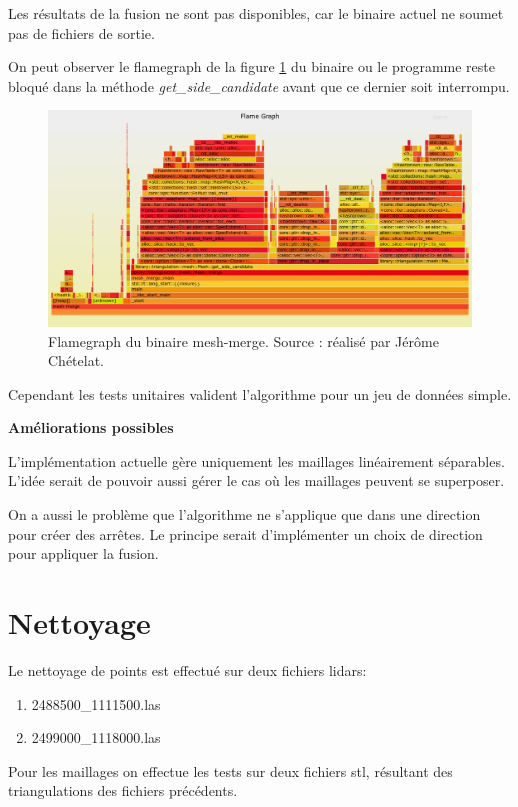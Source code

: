 Les résultats de la fusion ne sont pas disponibles, car le binaire actuel ne
soumet pas de fichiers de sortie.

On peut observer le flamegraph de la figure \ref{fig:flamegraph_mesh_merge}
du binaire ou le programme reste bloqué dans la méthode \textit{get\_side\_candidate}
avant que ce dernier soit interrompu.

\begin{figure}[htbp!]
    \centering
    \includegraphics[width=0.8\linewidth]{figures/merge-debug-flamegraph.png}
    \caption{Flamegraph du binaire mesh-merge. Source : réalisé par Jérôme Chételat.}
    \label{fig:flamegraph_mesh_merge}
\end{figure}


Cependant les tests unitaires valident l'algorithme pour un jeu de données simple.

\textbf{Améliorations possibles}

L'implémentation actuelle gère uniquement les maillages linéairement séparables.
L'idée serait de pouvoir aussi gérer le cas où les maillages peuvent se
superposer.

On a aussi le problème que l'algorithme ne s'applique que dans une direction
pour créer des arrêtes. Le principe serait d'implémenter un choix de direction
pour appliquer la fusion.

\newpage
\section{Nettoyage}

Le nettoyage de points est effectué sur deux fichiers lidars:
\begin{enumerate}
    \item 2488500\_1111500.las
    \item 2499000\_1118000.las
\end{enumerate}

Pour les maillages on effectue les tests sur deux fichiers \gls{stl}, résultant des triangulations des fichiers précédents.

